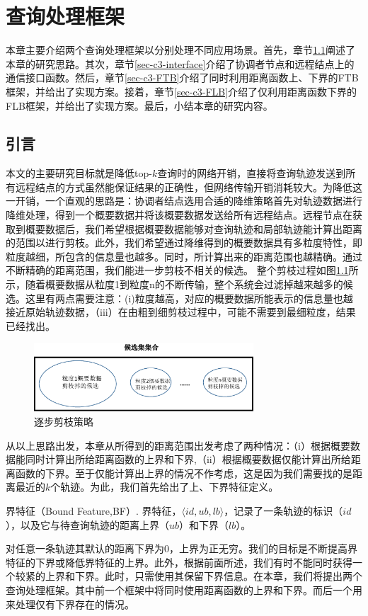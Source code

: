 \chapter{查询处理框架}\label{chapter:framework}
本章主要介绍两个查询处理框架以分别处理不同应用场景。首先，章节\ref{sec-c3-introduction}阐述了本章的研究思路。其次，章节\ref{sec-c3-interface}介绍了协调者节点和远程结点上的通信接口函数。然后，章节\ref{sec-c3-FTB}介绍了同时利用距离函数上、下界的FTB框架，并给出了实现方案。接着，章节\ref{sec-c3-FLB}介绍了仅利用距离函数下界的FLB框架，并给出了实现方案。最后，小结本章的研究内容。
\section{引言}\label{sec-c3-introduction}
本文的主要研究目标就是降低top-$k$查询时的网络开销，直接将查询轨迹发送到所有远程结点的方式虽然能保证结果的正确性，但网络传输开销消耗较大。为降低这一开销，一个直观的思路是：协调者结点选用合适的降维策略首先对轨迹数据进行降维处理，得到一个概要数据并将该概要数据发送给所有远程结点。远程节点在获取到概要数据后，我们希望根据概要数据能够对查询轨迹和局部轨迹能计算出距离的范围以进行剪枝。此外，我们希望通过降维得到的概要数据具有多粒度特性，即粒度越细，所包含的信息量也越多。同时，所计算出来的距离范围也越精确。通过不断精确的距离范围，我们能进一步剪枝不相关的候选。
整个剪枝过程如图\ref{fig-chapter3-pruningIdea}所示，随着概要数据从粒度1到粒度n的不断传输，整个系统会过滤掉越来越多的候选。这里有两点需要注意：(i)粒度越高，对应的概要数据所能表示的信息量也越接近原始轨迹数据，（iii）在由粗到细剪枝过程中，可能不需要到最细粒度，结果已经找出。
\begin{figure}
	\centering
	\includegraphics[width=0.73\textwidth]{Fig/chapter3/Idea}
	\caption{逐步剪枝策略}
	\label{fig-chapter3-pruningIdea}
\end{figure}


从以上思路出发，本章从所得到的距离范围出发考虑了两种情况：（i）根据概要数据能同时计算出所给距离函数的上界和下界,（ii）根据概要数据仅能计算出所给距离函数的下界。至于仅能计算出上界的情况不作考虑，这是因为我们需要找的是距离最近的$k$个轨迹。为此，我们首先给出了上、下界特征定义。
\begin{define}界特征（Bound Feature,BF）. 界特征，$\langle id, ub,lb \rangle$，记录了一条轨迹的标识（$id$），以及它与待查询轨迹的距离上界（$ub$）和下界（$lb$）。
\end{define}
对任意一条轨迹其默认的距离下界为0，上界为正无穷。我们的目标是不断提高界特征的下界或降低界特征的上界。此外，根据前面所述，我们有时不能同时获得一个较紧的上界和下界。此时，只需使用其保留下界信息。在本章，我们将提出两个查询处理框架。其中前一个框架中将同时使用距离函数的上界和下界。而后一个用来处理仅有下界存在的情况。




